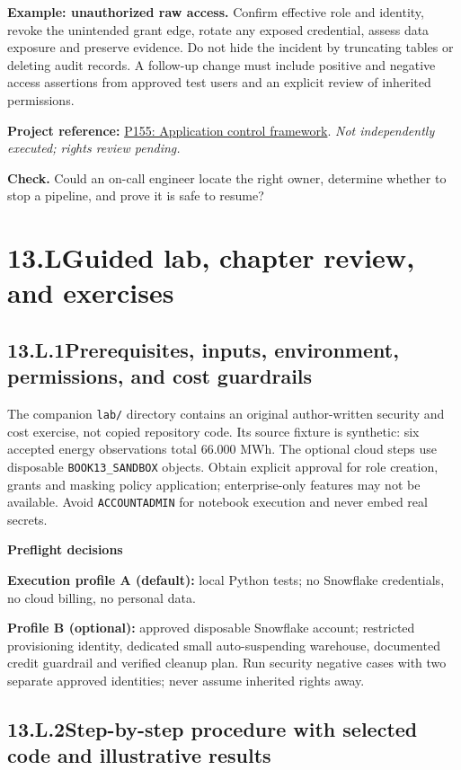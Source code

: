 \documentclass[11pt,twoside]{article}
\newcommand{\topic}[2]{\subsection*{#1\quad #2}}
\newcommand{\repo}[2]{\par\begingroup\fontsize{8.0}{9.6}\selectfont\sffamily\color{inkgray}\textbf{Project reference:} \href{#2}{#1}. \textit{Not independently executed; rights review pending.}\par\endgroup}
\begin{document}
\textbf{Example: unauthorized raw access.} Confirm effective role and identity, revoke the unintended grant edge, rotate any exposed credential, assess data exposure and preserve evidence. Do not hide the incident by truncating tables or deleting audit records. A follow-up change must include positive and negative access assertions from approved test users and an explicit review of inherited permissions.
\repo{P155: Application control framework}{https://github.com/Snowflake-Labs/sfguide-application-control-framework}
\textbf{Check.} Could an on-call engineer locate the right owner, determine whether to stop a pipeline, and prove it is safe to resume?
\newpage
\section*{13.L\quad Guided lab, chapter review, and exercises}
\topic{13.L.1}{Prerequisites, inputs, environment, permissions, and cost guardrails}
The companion \texttt{lab/} directory contains an original author-written security and cost exercise, not copied repository code. Its source fixture is synthetic: six accepted energy observations total 66.000 MWh. The optional cloud steps use disposable \texttt{BOOK13\_SANDBOX} objects. Obtain explicit approval for role creation, grants and masking policy application; enterprise-only features may not be available. Avoid \texttt{ACCOUNTADMIN} for notebook execution and never embed real secrets.
\begin{whitebox}\textbf{Preflight decisions}\par
\textbf{Execution profile A (default):} local Python tests; no Snowflake credentials, no cloud billing, no personal data.\par
\textbf{Profile B (optional):} approved disposable Snowflake account; restricted provisioning identity, dedicated small auto-suspending warehouse, documented credit guardrail and verified cleanup plan. Run security negative cases with two separate approved identities; never assume inherited rights away.
\end{whitebox}
\topic{13.L.2}{Step-by-step procedure with selected code and illustrative results}
\end{document}
